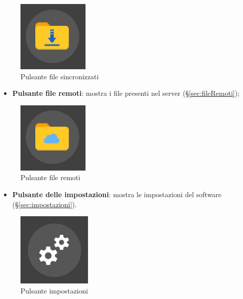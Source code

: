 \begin{figure}[H]
    \centering
    \includegraphics[scale = 1]{components/img/pulsanteFileS.png}
    \caption{Pulsante file sincronizzati}
    \label{fig:PfileSync}
\end{figure}
\begin{itemize}
\item \textbf{Pulsante file remoti}: mostra i file presenti nel server (\S{}\ref{sec:fileRemoti}); \
\end{itemize}
\begin{figure}[H]
    \centering
    \includegraphics[scale = 1]{components/img/pulsanteFileR.png}
    \caption{Pulsante file remoti}
    \label{fig:PfileRem}
\end{figure}
\begin{itemize}
\item \textbf{Pulsante delle impostazioni}: mostra le impostazioni del software (\S{}\ref{sec:impostazioni}). \
\end{itemize}
\begin{figure}[H]
    \centering
    \includegraphics[scale = 1]{components/img/pulsanteImpostazioni.png}
    \caption{Pulsante impostazioni}
    \label{fig:PImp}
\end{figure}


